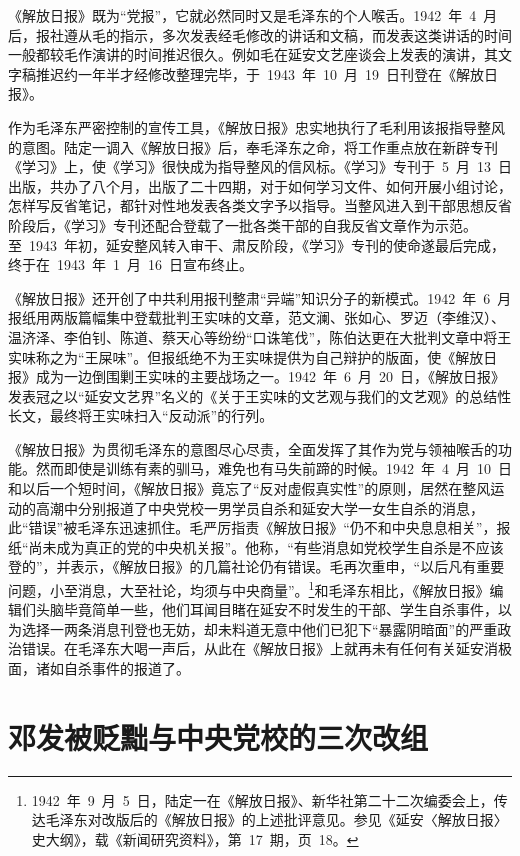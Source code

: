 《解放日报》既为“党报”，它就必然同时又是毛泽东的个人喉舌。1942~年~4~月后，报社遵从毛的指示，多次发表经毛修改的讲话和文稿，而发表这类讲话的时间一般都较毛作演讲的时间推迟很久。例如毛在延安文艺座谈会上发表的演讲，其文字稿推迟约一年半才经修改整理完毕，于~1943~年~10~月~19~日刊登在《解放日报》。

作为毛泽东严密控制的宣传工具，《解放日报》忠实地执行了毛利用该报指导整风的意图。陆定一调入《解放日报》后，奉毛泽东之命，将工作重点放在新辟专刊《学习》上，使《学习》很快成为指导整风的信风标。《学习》专刊于~5~月~13~日出版，共办了八个月，出版了二十四期，对于如何学习文件、如何开展小组讨论，怎样写反省笔记，都针对性地发表各类文字予以指导。当整风进入到干部思想反省阶段后，《学习》专刊还配合登载了一批各类干部的自我反省文章作为示范。至~1943~年初，延安整风转入审干、肃反阶段，《学习》专刊的使命遂最后完成，终于在~1943~年~1~月~16~日宣布终止。

《解放日报》还开创了中共利用报刊整肃“异端”知识分子的新模式。1942~年~6~月报纸用两版篇幅集中登载批判王实味的文章，范文澜、张如心、罗迈（李维汉）、温济泽、李伯钊、陈道、蔡天心等纷纷“口诛笔伐”，陈伯达更在大批判文章中将王实味称之为“王屎味”。但报纸绝不为王实味提供为自己辩护的版面，使《解放日报》成为一边倒围剿王实味的主要战场之一。1942~年~6~月~20~日，《解放日报》发表冠之以“延安文艺界”名义的《关于王实味的文艺观与我们的文艺观》的总结性长文，最终将王实味扫入“反动派”的行列。

《解放日报》为贯彻毛泽东的意图尽心尽责，全面发挥了其作为党与领袖喉舌的功能。然而即使是训练有素的驯马，难免也有马失前蹄的时候。1942~年~4~月~10~日和以后一个短时间，《解放日报》竟忘了“反对虚假真实性”的原则，居然在整风运动的高潮中分别报道了中央党校一男学员自杀和延安大学一女生自杀的消息，此“错误”被毛泽东迅速抓住。毛严厉指责《解放日报》“仍不和中央息息相关”，报纸“尚未成为真正的党的中央机关报”。他称，“有些消息如党校学生自杀是不应该登的”，并表示，《解放日报》的几篇社论仍有错误。毛再次重申，“以后凡有重要问题，小至消息，大至社论，均须与中央商量”。\footnote{1942~年~9~月~5~日，陆定一在《解放日报》、新华社第二十二次编委会上，传达毛泽东对改版后的《解放日报》的上述批评意见。参见《延安〈解放日报〉史大纲》，载《新闻研究资料》，第~17~期，页~18。}和毛泽东相比，《解放日报》编辑们头脑毕竟简单一些，他们耳闻目睹在延安不时发生的干部、学生自杀事件，以为选择一两条消息刊登也无妨，却未料道无意中他们已犯下“暴露阴暗面”的严重政治错误。在毛泽东大喝一声后，从此在《解放日报》上就再未有任何有关延安消极面，诸如自杀事件的报道了。

\section{邓发被贬黜与中央党校的三次改组}

